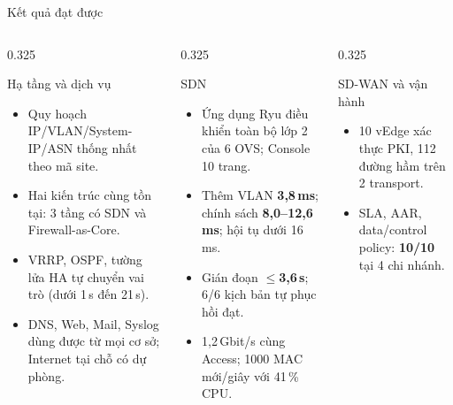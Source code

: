 \documentclass[aspectratio=169, 10pt, xcolor={table}]{beamer}
\newcommand{\compactlist}{\setlength{\itemsep}{1pt}\setlength{\parskip}{0pt}}
\begin{document}
\begin{frame}{Kết quả đạt được}
    \begin{columns}[T]
        \begin{column}{0.325\textwidth}
            \begin{card}{Hạ tầng và dịch vụ}
                \scriptsize
                \begin{itemize}\compactlist
                    \item Quy hoạch IP/VLAN/System-IP/ASN thống nhất theo mã site.
                    \item Hai kiến trúc cùng tồn tại: 3 tầng có SDN và Firewall-as-Core.
                    \item VRRP, OSPF, tường lửa HA tự chuyển vai trò (dưới 1\,s đến 21\,s).
                    \item DNS, Web, Mail, Syslog dùng được từ mọi cơ sở; Internet tại chỗ có dự phòng.
                \end{itemize}
            \end{card}
        \end{column}
        \begin{column}{0.325\textwidth}
            \begin{card}[accent]{SDN}
                \scriptsize
                \begin{itemize}\compactlist
                    \item Ứng dụng Ryu điều khiển toàn bộ lớp 2 của 6 OVS; Console 10 trang.
                    \item Thêm VLAN \textbf{3,8\,ms}; chính sách \textbf{8,0--12,6\,ms}; hội tụ dưới 16\,ms.
                    \item Gián đoạn $\le$\textbf{3,6\,s}; 6/6 kịch bản tự phục hồi đạt.
                    \item 1,2\,Gbit/s cùng Access; 1000 MAC mới/giây với 41\,\% CPU.
                \end{itemize}
            \end{card}
        \end{column}
        \begin{column}{0.325\textwidth}
            \begin{card}[okGreen]{SD-WAN và vận hành}
                \scriptsize
                \begin{itemize}\compactlist
                    \item 10 vEdge xác thực PKI, 112 đường hầm trên 2 transport.
                    \item SLA, AAR, data/control policy: \textbf{10/10} tại 4 chi nhánh.

\end{itemize}
\end{card}
\end{column}
\end{columns}
\end{frame}
\end{document}
